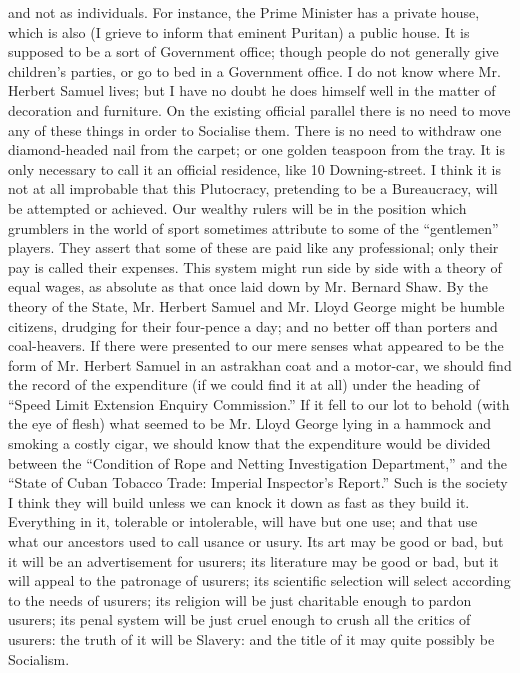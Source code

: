 \documentclass{book}
\begin{document}
and not as individuals. For instance, the Prime Minister has a private house, which is also (I grieve to inform that eminent Puritan) a public house. It is supposed to be a sort of Government office; though people do not generally give children’s parties, or go to bed in a Government office. I do not know where Mr. Herbert Samuel lives; but I have no doubt he does himself well in the matter of decoration and furniture. On the existing official parallel there is no need to move any of these things in order to Socialise them. There is no need to withdraw one diamond-headed nail from the carpet; or one golden teaspoon from the tray. It is only necessary to call it an official residence, like 10 Downing-street. I think it is not at all improbable that this Plutocracy, pretending to be a Bureaucracy, will be attempted or achieved. Our wealthy rulers will be in the position which grumblers in the world of sport sometimes attribute to some of the “gentlemen” players. They assert that some of these are paid like any professional; only their pay is called their expenses. This system might run side by side with a theory of equal wages, as absolute as that once laid down by Mr. Bernard Shaw. By the theory of the State, Mr. Herbert Samuel and Mr. Lloyd George might be humble citizens, drudging for their four-pence a day; and no better off than porters and coal-heavers. If there were presented to our mere senses what appeared to be the form of Mr. Herbert Samuel in an astrakhan coat and a motor-car, we should find the record of the expenditure (if we could find it at all) under the heading of “Speed Limit Extension Enquiry Commission.” If it fell to our lot to behold (with the eye of flesh) what seemed to be Mr. Lloyd George lying in a hammock and smoking a costly cigar, we should know that the expenditure would be divided between the “Condition of Rope and Netting Investigation Department,” and the “State of Cuban Tobacco Trade: Imperial Inspector’s Report.” Such is the society I think they will build unless we can knock it down as fast as they build it. Everything in it, tolerable or intolerable, will have but one use; and that use what our ancestors used to call usance or usury. Its art may be good or bad, but it will be an advertisement for usurers; its literature may be good or bad, but it will appeal to the patronage of usurers; its scientific selection will select according to the needs of usurers; its religion will be just charitable enough to pardon usurers; its penal system will be just cruel enough to crush all the critics of usurers: the truth of it will be Slavery: and the title of it may quite possibly be Socialism.
\end{document}

